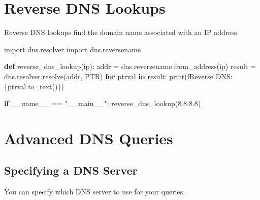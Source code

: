 \documentclass[
  letterpaper,
  DIV=11,
  numbers=noendperiod]{scrreprt}
\newenvironment{Shaded}{\begin{snugshade}}{\end{snugshade}}
\newcommand{\BuiltInTok}[1]{\textcolor[rgb]{0.00,0.23,0.31}{#1}}
\newcommand{\ControlFlowTok}[1]{\textcolor[rgb]{0.00,0.23,0.31}{\textbf{#1}}}
\newcommand{\ImportTok}[1]{\textcolor[rgb]{0.00,0.46,0.62}{#1}}
\newcommand{\KeywordTok}[1]{\textcolor[rgb]{0.00,0.23,0.31}{\textbf{#1}}}
\newcommand{\NormalTok}[1]{\textcolor[rgb]{0.00,0.23,0.31}{#1}}
\newcommand{\OperatorTok}[1]{\textcolor[rgb]{0.37,0.37,0.37}{#1}}
\newcommand{\SpecialCharTok}[1]{\textcolor[rgb]{0.37,0.37,0.37}{#1}}
\newcommand{\SpecialStringTok}[1]{\textcolor[rgb]{0.13,0.47,0.30}{#1}}
\newcommand{\StringTok}[1]{\textcolor[rgb]{0.13,0.47,0.30}{#1}}
\newcommand{\VariableTok}[1]{\textcolor[rgb]{0.07,0.07,0.07}{#1}}
\begin{document}
\section{Reverse DNS Lookups}\label{reverse-dns-lookups}

Reverse DNS lookups find the domain name associated with an IP address.

\begin{Shaded}
\begin{Highlighting}[]
\ImportTok{import}\NormalTok{ dns.resolver}
\ImportTok{import}\NormalTok{ dns.reversename}

\KeywordTok{def}\NormalTok{ reverse\_dns\_lookup(ip):}
\NormalTok{    addr }\OperatorTok{=}\NormalTok{ dns.reversename.from\_address(ip)}
\NormalTok{    result }\OperatorTok{=}\NormalTok{ dns.resolver.resolve(addr, }\StringTok{\textquotesingle{}PTR\textquotesingle{}}\NormalTok{)}
    \ControlFlowTok{for}\NormalTok{ ptrval }\KeywordTok{in}\NormalTok{ result:}
        \BuiltInTok{print}\NormalTok{(}\SpecialStringTok{f\textquotesingle{}Reverse DNS: }\SpecialCharTok{\{}\NormalTok{ptrval}\SpecialCharTok{.}\NormalTok{to\_text()}\SpecialCharTok{\}}\SpecialStringTok{\textquotesingle{}}\NormalTok{)}

\ControlFlowTok{if} \VariableTok{\_\_name\_\_} \OperatorTok{==} \StringTok{"\_\_main\_\_"}\NormalTok{:}
\NormalTok{    reverse\_dns\_lookup(}\StringTok{\textquotesingle{}8.8.8.8\textquotesingle{}}\NormalTok{)}
\end{Highlighting}
\end{Shaded}

\section{Advanced DNS Queries}\label{advanced-dns-queries}

\subsection{Specifying a DNS Server}\label{specifying-a-dns-server}

You can specify which DNS server to use for your queries.
\end{document}

